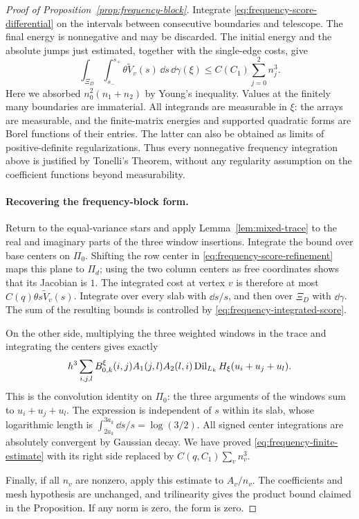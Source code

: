 \begin{proof}[Proof of Proposition~\ref{prop:frequency-block}]
Integrate \eqref{eq:frequency-score-differential} on the intervals
between consecutive boundaries and telescope.  The final energy
is nonnegative and may be discarded.  The initial energy and
the absolute jumps just estimated, together with the single-edge
costs, give
\begin{equation}\label{eq:frequency-integrated-score}
 \int_{\Xi_D}\int_{s_-}^{s_+}
        \theta\widetilde V_v(s)\,\dd s\,\dd\gamma(\xi)
 \leq C(C_1)\sum_{j=0}^2n_j^3.
\end{equation}
Here we absorbed $n_0^2(n_1+n_2)$ by Young's inequality.
Values at the finitely many boundaries are immaterial.
All integrands are measurable in $\xi$: the arrays are measurable,
and the finite-matrix energies and supported quadratic forms are
Borel functions of their entries.  The latter can also be obtained
as limits of positive-definite regularizations.  Thus every
nonnegative frequency integration above is justified by Tonelli's
Theorem, without any regularity assumption on the coefficient
functions beyond measurability.

\paragraph{Recovering the frequency-block form.}
Return to the equal-variance stars and apply
Lemma~\ref{lem:mixed-trace} to the real and imaginary parts of
the three window insertions.  Integrate the bound over base centers
on $\Pi_0$.  Shifting the row center in
\eqref{eq:frequency-score-refinement} maps this plane to $\Pi_d$;
using the two column centers as free coordinates shows that its
Jacobian is $1$.  The integrated cost at vertex $v$ is therefore
at most
$C(q)\theta s\widetilde V_v(s)$.
Integrate over every slab with $\dd s/s$, and then over $\Xi_D$
with $\dd\gamma$.  The sum of the resulting bounds is controlled
by \eqref{eq:frequency-integrated-score}.

On the other side, multiplying the three weighted windows in
the trace and integrating the centers gives exactly
\[
 h^3\sum_{i,j,l}B_{0,k}^\xi(i,j)A_1(j,l)A_2(l,i)
                \operatorname{Dil}_{L_k}H_\xi(u_i+u_j+u_l).
\]
This is the convolution identity on $\Pi_0$: the three arguments
of the windows sum to $u_i+u_j+u_l$.  The expression is independent
of $s$ within its slab, whose logarithmic length is
$\int_{2a_k}^{3a_k}\dd s/s=\log(3/2)$.
All signed center integrations are absolutely convergent by
Gaussian decay.  We have proved
\eqref{eq:frequency-finite-estimate} with its right side replaced
by $C(q,C_1)\sum_v n_v^3$.

Finally, if all $n_v$ are nonzero, apply this estimate to
$A_v/n_v$.  The coefficients and mesh hypothesis are unchanged,
and trilinearity gives the product bound claimed in the
Proposition.  If any norm is zero, the form is zero.
\end{proof}

